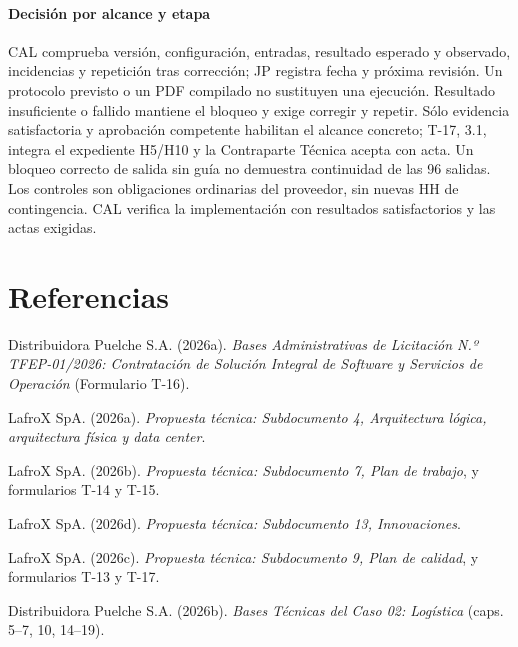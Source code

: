 \documentclass[carta,firma,sinnotas]{lafrox}
\begin{document}
\paragraph{Decisión por alcance y etapa}
CAL comprueba versión, configuración, entradas, resultado esperado y observado,
incidencias y repetición tras corrección; JP registra fecha y próxima revisión.
Un protocolo previsto o un PDF compilado no sustituyen una ejecución.
Resultado insuficiente o fallido mantiene el bloqueo y exige corregir y repetir.
Sólo evidencia satisfactoria y aprobación competente habilitan el alcance
concreto; T-17, 3.1, integra el expediente H5/H10 y la Contraparte Técnica acepta
con acta. Un bloqueo correcto de salida sin guía no demuestra continuidad de las
96 salidas. Los controles son obligaciones ordinarias del proveedor, sin nuevas
HH de contingencia. CAL verifica la implementación con resultados satisfactorios y las actas exigidas.






\section*{Referencias}
\begingroup
\small\setlength{\parindent}{-0.5in}\setlength{\leftskip}{0.5in}\setlength{\parskip}{3pt}
Distribuidora Puelche S.A. (2026a). \emph{Bases Administrativas de Licitación N.º TFEP-01/2026: Contratación de Solución Integral de Software y Servicios de Operación} (Formulario T-16).


LafroX SpA. (2026a). \emph{Propuesta técnica: Subdocumento 4, Arquitectura lógica, arquitectura física y data center}.

LafroX SpA. (2026b). \emph{Propuesta técnica: Subdocumento 7, Plan de trabajo}, y formularios T-14 y T-15.

LafroX SpA. (2026d). \emph{Propuesta técnica: Subdocumento 13, Innovaciones}.

LafroX SpA. (2026c). \emph{Propuesta técnica: Subdocumento 9, Plan de calidad}, y formularios T-13 y T-17.

Distribuidora Puelche S.A. (2026b). \emph{Bases Técnicas del Caso 02: Logística} (caps. 5--7, 10, 14--19).


\endgroup
\end{document}
